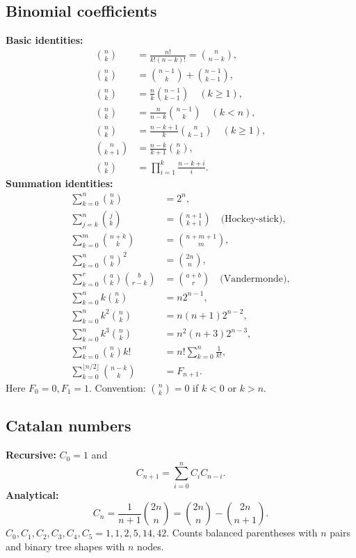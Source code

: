 \documentclass[portrait, 8pt, a4paper, oneside, twocolumn]{extarticle}
\begin{document}
\subsection{Binomial coefficients}
\textbf{Basic identities:}
\begin{align*}
\binom{n}{k} &= \frac{n!}{k!(n-k)!}=\binom{n}{n-k},\\
\binom{n}{k} &= \binom{n-1}{k}+\binom{n-1}{k-1},\\
\binom{n}{k} &= \frac{n}{k}\binom{n-1}{k-1}\quad(k\ge1),\\
\binom{n}{k} &= \frac{n}{n-k}\binom{n-1}{k}\quad(k<n),\\
\binom{n}{k} &= \frac{n-k+1}{k}\binom{n}{k-1}\quad(k\ge1),\\
\binom{n}{k+1} &= \frac{n-k}{k+1}\binom{n}{k},\\
\binom{n}{k} &= \prod_{i=1}^{k}\frac{n-k+i}{i}.
\end{align*}
\textbf{Summation identities:}
\begin{align*}
\sum_{k=0}^{n}\binom{n}{k} &=2^n,\\
\sum_{j=k}^{n}\binom{j}{k} &=\binom{n+1}{k+1}\quad\text{(Hockey-stick)},\\
\sum_{k=0}^{m}\binom{n+k}{k} &=\binom{n+m+1}{m},\\
\sum_{k=0}^{n}\binom{n}{k}^2 &=\binom{2n}{n},\\
\sum_{k=0}^{r}\binom{a}{k}\binom{b}{r-k} &=\binom{a+b}{r}\quad\text{(Vandermonde)},\\
\sum_{k=0}^{n}k\binom{n}{k} &=n2^{n-1},\\
\sum_{k=0}^{n}k^2\binom{n}{k} &=n(n+1)2^{n-2},\\
\sum_{k=0}^{n}k^3\binom{n}{k} &=n^2(n+3)2^{n-3},\\
\sum_{k=0}^{n}\binom{n}{k}k! &=n!\sum_{k=0}^{n}\frac{1}{k!},\\
\sum_{k=0}^{\lfloor n/2\rfloor}\binom{n-k}{k} &=F_{n+1}.
\end{align*}
Here $F_0=0,F_1=1$. Convention: $\binom{n}{k}=0$ if $k<0$ or $k>n$.

\subsection{Catalan numbers}
\textbf{Recursive:} $C_0=1$ and
\[
C_{n+1}=\sum_{i=0}^{n}C_iC_{n-i}.
\]
\textbf{Analytical:}
\[
C_n=\frac{1}{n+1}\binom{2n}{n}
=\binom{2n}{n}-\binom{2n}{n+1}.
\]
$C_0,C_1,C_2,C_3,C_4,C_5=1,1,2,5,14,42$.
Counts balanced parentheses with $n$ pairs and binary tree shapes with $n$ nodes.
\end{document}

